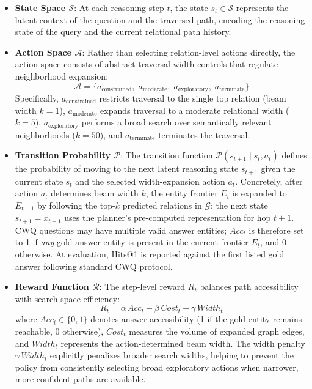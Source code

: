 \documentclass[10pt,conference]{IEEEtran}
\begin{document}
\begin{itemize}
\item \textbf{State Space $\mathcal{S}$}: At each reasoning step $t$, the state $s_t \in \mathcal{S}$ represents the latent context of the question and the traversed path, encoding the reasoning state of the query and the current relational path history.
\item \textbf{Action Space $\mathcal{A}$}: Rather than selecting relation-level actions directly, the action space consists of abstract traversal-width controls that regulate neighborhood expansion:
\begin{equation}
\mathcal{A} = \{ a_{\text{constrained}},\; a_{\text{moderate}},\; a_{\text{exploratory}},\; a_{\text{terminate}} \}
\end{equation}
Specifically, $a_{\text{constrained}}$ restricts traversal to the single top relation (beam width $k=1$), $a_{\text{moderate}}$ expands traversal to a moderate relational width ($k=5$), $a_{\text{exploratory}}$ performs a broad search over semantically relevant neighborhoods ($k=50$), and $a_{\text{terminate}}$ terminates the traversal.
\item \textbf{Transition Probability $\mathcal{P}$}: The transition function $\mathcal{P}(s_{t+1} \mid s_t, a_t)$ defines the probability of moving to the next latent reasoning state $s_{t+1}$ given the current state $s_t$ and the selected width-expansion action $a_t$. Concretely, after action $a_t$ determines beam width $k$, the entity frontier $E_t$ is expanded to $E_{t+1}$ by following the top-$k$ predicted relations in $\mathcal{G}$; the next state $s_{t+1} = x_{t+1}$ uses the planner's pre-computed representation for hop $t{+}1$. CWQ questions may have multiple valid answer entities; $Acc_t$ is therefore set to 1 if \emph{any} gold answer entity is present in the current frontier $E_t$, and 0 otherwise. At evaluation, Hits@1 is reported against the first listed gold answer following standard CWQ protocol.
\item \textbf{Reward Function $\mathcal{R}$}: The step-level reward $R_t$ balances path accessibility with search space efficiency:
\begin{equation}
R_t = \alpha\, Acc_t - \beta\, Cost_t - \gamma\, Width_t
\end{equation}
where $Acc_t \in \{0, 1\}$ denotes answer accessibility (1 if the gold entity remains reachable, 0 otherwise), $Cost_t$ measures the volume of expanded graph edges, and $Width_t$ represents the action-determined beam width. The width penalty $\gamma\, Width_t$ explicitly penalizes broader search widths, helping to prevent the policy from consistently selecting broad exploratory actions when narrower, more confident paths are available.
\end{itemize}
\end{document}
